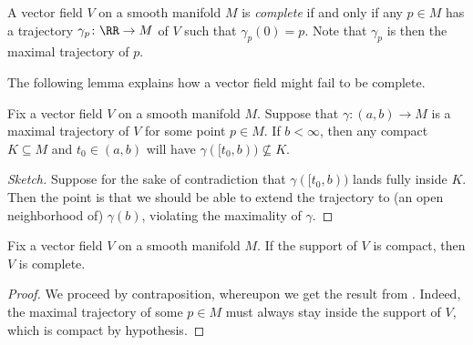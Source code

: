 \documentclass[../notes.tex]{subfiles}
\begin{document}
\begin{definition}[complete]
	A vector field $V$ on a smooth manifold $M$ is \textit{complete} if and only if any $p\in M$ has a trajectory $\gamma_p\colon\RR\to M$ of $V$ such that $\gamma_p(0)=p$. Note that $\gamma_p$ is then the maximal trajectory of $p$.
\end{definition}
The following lemma explains how a vector field might fail to be complete.
\begin{lemma}[Escape] \label{lem:escape}
	Fix a vector field $V$ on a smooth manifold $M$. Suppose that $\gamma\colon(a,b)\to M$ is a maximal trajectory of $V$ for some point $p\in M$. If $b<\infty$, then any compact $K\subseteq M$ and $t_0\in (a,b)$ will have $\gamma([t_0,b))\not\subseteq K$.
\end{lemma}
\begin{proof}[Sketch]
	Suppose for the sake of contradiction that $\gamma([t_0,b))$ lands fully inside $K$. Then the point is that we should be able to extend the trajectory to (an open neighborhood of) $\gamma(b)$, violating the maximality of $\gamma$.
\end{proof}
\begin{corollary} \label{cor:compact-support-is-complete}
	Fix a vector field $V$ on a smooth manifold $M$. If the support of $V$ is compact, then $V$ is complete.
\end{corollary}
\begin{proof}
	We proceed by contraposition, whereupon we get the result from . Indeed, the maximal trajectory of some $p\in M$ must always stay inside the support of $V$, which is compact by hypothesis.
\end{proof}
\end{document}
